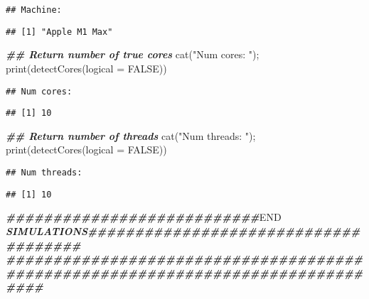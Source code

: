 \documentclass[
  11pt,
]{article}
\newenvironment{Shaded}{\begin{snugshade}}{\end{snugshade}}
\newcommand{\AttributeTok}[1]{\textcolor[rgb]{0.77,0.63,0.00}{#1}}
\newcommand{\ConstantTok}[1]{\textcolor[rgb]{0.00,0.00,0.00}{#1}}
\newcommand{\DocumentationTok}[1]{\textcolor[rgb]{0.56,0.35,0.01}{\textbf{\textit{#1}}}}
\newcommand{\FunctionTok}[1]{\textcolor[rgb]{0.00,0.00,0.00}{#1}}
\newcommand{\NormalTok}[1]{#1}
\newcommand{\RegionMarkerTok}[1]{#1}
\newcommand{\SpecialCharTok}[1]{\textcolor[rgb]{0.00,0.00,0.00}{#1}}
\newcommand{\StringTok}[1]{\textcolor[rgb]{0.31,0.60,0.02}{#1}}
\begin{document}
\begin{Shaded}
\end{Shaded}

\begin{verbatim}
## Machine:
\end{verbatim}

\begin{verbatim}
## [1] "Apple M1 Max"
\end{verbatim}

\begin{Shaded}
\begin{Highlighting}[]
\DocumentationTok{\#\# Return number of true cores}
\FunctionTok{cat}\NormalTok{(}\StringTok{"Num cores:   "}\NormalTok{); }\FunctionTok{print}\NormalTok{(}\FunctionTok{detectCores}\NormalTok{(}\AttributeTok{logical =} \ConstantTok{FALSE}\NormalTok{))}
\end{Highlighting}
\end{Shaded}

\begin{verbatim}
## Num cores:
\end{verbatim}

\begin{verbatim}
## [1] 10
\end{verbatim}

\begin{Shaded}
\begin{Highlighting}[]
\DocumentationTok{\#\# Return number of threads}
\FunctionTok{cat}\NormalTok{(}\StringTok{"Num threads: "}\NormalTok{); }\FunctionTok{print}\NormalTok{(}\FunctionTok{detectCores}\NormalTok{(}\AttributeTok{logical =} \ConstantTok{FALSE}\NormalTok{))}
\end{Highlighting}
\end{Shaded}

\begin{verbatim}
## Num threads:
\end{verbatim}

\begin{verbatim}
## [1] 10
\end{verbatim}

\begin{Shaded}
\begin{Highlighting}[]
\DocumentationTok{\#\#\#\#\#\#\#\#\#\#\#\#\#\#\#\#\#\#\#\#\#\#\#\#\#\#\#}\RegionMarkerTok{END}\DocumentationTok{ SIMULATIONS\#\#\#\#\#\#\#\#\#\#\#\#\#\#\#\#\#\#\#\#\#\#\#\#\#\#\#\#\#\#\#\#\#\#\#\#\#}
\DocumentationTok{\#\#\#\#\#\#\#\#\#\#\#\#\#\#\#\#\#\#\#\#\#\#\#\#\#\#\#\#\#\#\#\#\#\#\#\#\#\#\#\#\#\#\#\#\#\#\#\#\#\#\#\#\#\#\#\#\#\#\#\#\#\#\#\#\#\#\#\#\#\#\#\#\#\#\#\#\#\#\#\#}
\end{Highlighting}
\end{Shaded}
\end{document}
